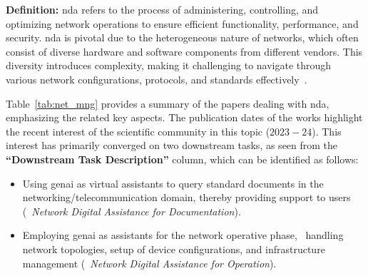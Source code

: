 
\noindent
\textbf{Definition:}
\gls{nda} refers to the process of administering, controlling, and optimizing network operations to ensure efficient functionality, performance, and security.
\gls{nda} is pivotal due to the heterogeneous nature of networks, which often consist of diverse hardware and software components from different vendors. 
This diversity introduces complexity, making it challenging to navigate through various network configurations, protocols, and standards effectively~\cite{wang2023network}.


Table~\ref{tab:net_mng} provides a summary of the papers dealing with \gls{nda}, emphasizing the related key aspects.
The publication dates of the works highlight the recent interest of the scientific community in this topic ($2023-24$).
This interest has primarily converged on two downstream tasks, as seen from the \textbf{``Downstream Task Description''} column,
which can be identified as follows:
\begin{itemize}
    \item Using \gls{genai} as virtual assistants to query standard documents in the networking/telecommunication domain, thereby providing support to users (\viz~\emph{Network Digital Assistance for Documentation}).
    \item Employing \gls{genai} as assistants for the network operative phase, \eg~handling network topologies, setup of device configurations, and infrastructure management (\viz~\emph{Network Digital Assistance for Operation}).
\end{itemize}








